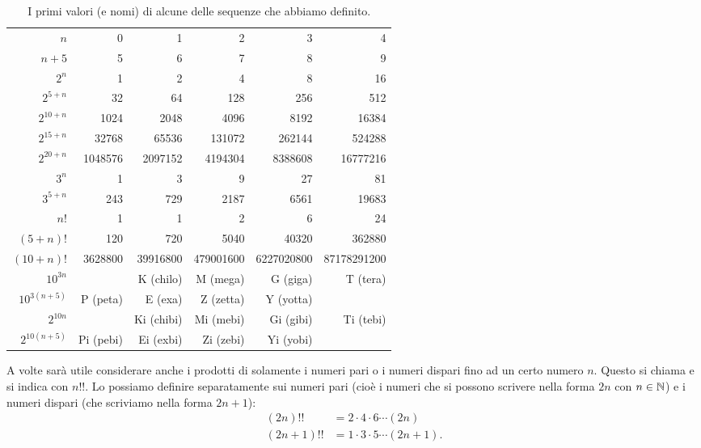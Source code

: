 \begin{table}
  \begin{center}
  \begin{tabular}{r|>{\small}r>{\small}r>{\small}r>{\small}r>{\small}r}
  $n$       & 0 & 1 & 2 & 3 & 4 \\
  \footnotesize $n+5$     & 5 & 6 & 7 & 8 & 9 \\ \hline
  $2^n$     & 1 & 2 & 4 & 8 & 16 \\
  \footnotesize $2^{5+n}$ & 32 & 64 & 128 & 256 & 512 \\
  \footnotesize $2^{10+n}$ & 1024 & 2048 & 4096 & 8192 & 16384 \\
  \footnotesize $2^{15+n}$ & 32768 & 65536 & 131072 & 262144 & 524288 \\
  \footnotesize $2^{20+n}$ & 1048576 & 2097152 & 4194304 & 8388608 & 16777216 \\  \hline
  $3^n$                    & 1 & 3 & 9 & 27 & 81 \\
  \footnotesize $3^{5+n}$  & 243 & 729 & 2187 & 6561 & 19683 \\  \hline
  $n!$      & 1 & 1 & 2 & 6 & 24 \\
  \footnotesize $(5+n)!$  & 120 & 720 & 5040 & 40320 & 362880 \\
  \footnotesize $(10+n)!$  & 3628800 & 39916800 & 479001600 & 6227020800 & 87178291200 \\ \hline
  \footnotesize $10^{3n}$  &  & K (chilo) & M (mega) & G (giga) & T (tera) \\ 
  \footnotesize $10^{3(n+5)}$  & P (peta) & E (exa) & Z (zetta) & Y (yotta) \\ \hline
  \footnotesize $2^{10n}$  &  & Ki (chibi) & Mi (mebi) & Gi (gibi) & Ti (tebi) \\
  \footnotesize $2^{10(n+5)}$ & Pi (pebi)& Ei (exbi) & Zi (zebi) & Yi (yobi)
  \end{tabular}
  \end{center}
  \caption{I primi valori (e nomi) di alcune delle sequenze che abbiamo definito.}
  \end{table}
  
  A volte sarà utile considerare anche i prodotti di solamente i numeri
  pari o i numeri dispari fino ad un certo numero $n$. Questo
  si chiama  e si indica con $n!!$. 
  Lo possiamo definire separatamente sui numeri pari (cioè 
  i numeri che si possono scrivere nella forma $2n$ con $n\in {\mathbb N}$)
  e i numeri dispari (che scriviamo nella forma $2n+1$):
  \begin{align*}
    (2n)!! &= 2 \cdot 4 \cdot 6 \cdots (2n) \\
    (2n+1)!! &= 1 \cdot 3 \cdot 5 \cdots (2n+1).
  \end{align*}
  
